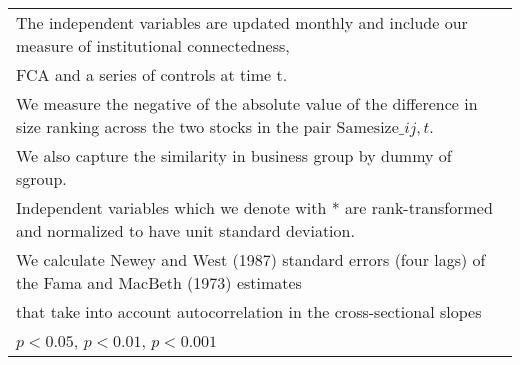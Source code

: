 {\begin{tabular}{l*{7}{c}}
\multicolumn{8}{l}{\footnotesize The independent variables are updated monthly and include our measure of institutional connectedness,}\\
\multicolumn{8}{l}{\footnotesize  FCA and a series of controls at time t.}\\
\multicolumn{8}{l}{\footnotesize We measure the negative of the absolute value of the difference in size ranking across the two stocks in the pair $ \text{Samesize}\_{ij,t} $.}\\
\multicolumn{8}{l}{\footnotesize We also capture the similarity in business group by dummy of sgroup.}\\
\multicolumn{8}{l}{\footnotesize Independent variables which  we denote with * are rank-transformed and normalized to have unit standard deviation.}\\
\multicolumn{8}{l}{\footnotesize  We calculate Newey and West (1987) standard errors (four lags) of the Fama and MacBeth (1973) estimates }\\
\multicolumn{8}{l}{\footnotesize  that take into account autocorrelation in the cross-sectional slopes}\\
\multicolumn{8}{l}{\footnotesize \sym{*} \(p<0.05\), \sym{**} \(p<0.01\), \sym{***} \(p<0.001\)}\\
\end{tabular}
}
